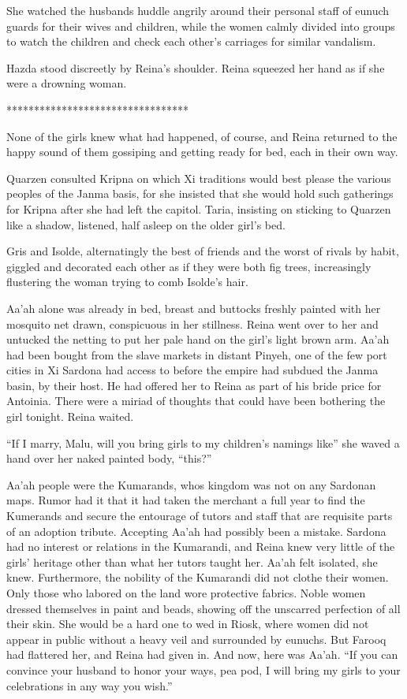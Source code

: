 \documentclass{article}
\begin{document}
	She watched the husbands huddle angrily around their personal staff of eunuch guards for their wives and children, while the women calmly divided into groups to watch the children and check each other’s carriages for similar vandalism. 
	
	Hazda stood discreetly by Reina’s shoulder. Reina squeezed her hand as if she were a drowning woman.
	
	*********************************
	
	None of the girls knew what had happened, of course, and Reina returned to the happy sound of them gossiping and getting ready for bed, each in their own way. 
	
	Quarzen consulted Kripna on which Xi traditions would best please the various peoples of the Janma basis, for she insisted that she would hold such gatherings for Kripna after she had left the capitol. Taria, insisting on sticking to Quarzen like a shadow, listened, half asleep on the older girl’s bed.
	
	Gris and Isolde, alternatingly the best of friends and the worst of rivals by habit, giggled and decorated each other as if they were both fig trees, increasingly flustering the woman trying to comb Isolde’s hair.
	
	Aa’ah alone was already in bed, breast and buttocks freshly painted with her mosquito net drawn, conspicuous in her stillness. Reina went over to her and untucked the netting to put her pale hand on the girl’s light brown arm. Aa’ah had been bought from the slave markets in distant Pinyeh, one of the few port cities in Xi Sardona had access to before the empire had subdued the Janma basin, by their host. He had offered her to Reina as part of his bride price for Antoinia. There were a miriad of thoughts that could have been bothering the girl tonight. Reina waited.
	
	“If I marry, Malu, will you bring girls to my children’s namings like” she waved a hand over her naked painted body, “this?” 
	
	Aa’ah people were the Kumarands, whos kingdom was not on any Sardonan maps. Rumor had it that it had taken the merchant a full year to find the Kumerands and secure the entourage of tutors and staff that are requisite parts of an adoption tribute. Accepting Aa’ah had possibly been a mistake. Sardona had no interest or relations in the Kumarandi, and Reina knew very little of the girls’ heritage other than what her tutors taught her. Aa’ah felt isolated, she knew. Furthermore, the nobility of the Kumarandi did not clothe their women. Only those who labored on the land wore protective fabrics. Noble women dressed themselves in paint and beads, showing off the unscarred perfection of all their skin. She would be a hard one to wed in Riosk, where women did not appear in public without a heavy veil and surrounded by eunuchs. But Farooq had flattered her, and Reina had given in. And now, here was Aa’ah. “If you can convince your husband to honor your ways, pea pod, I will bring my girls to your celebrations in any way you wish.”
	
\end{document}
